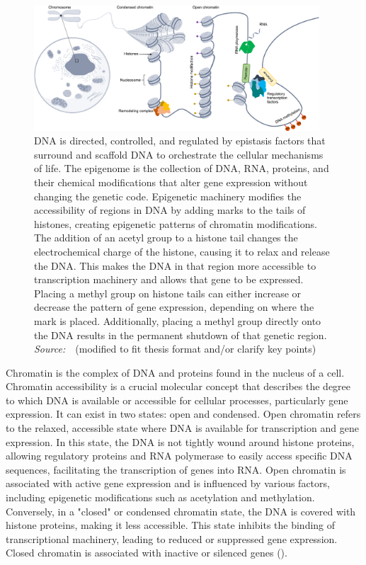 \begin{figure}[!ht]
	\centering
	\includegraphics[width=0.95\textwidth]{chromatin_organization/fig}
	\vspace{0.1cm}
	\caption[DNA organization] {DNA is directed, controlled, and regulated by epistasis factors that surround and scaffold DNA to orchestrate the cellular mechanisms of life. The epigenome is the collection of DNA, RNA, proteins, and their chemical modifications that alter gene expression without changing the genetic code. Epigenetic machinery modifies the accessibility of regions in DNA by adding marks to the tails of histones, creating epigenetic patterns of chromatin modifications. The addition of an acetyl group to a histone tail changes the electrochemical charge of the histone, causing it to relax and release the DNA. This makes the DNA in that region more accessible to transcription machinery and allows that gene to be expressed. Placing a methyl group on histone tails can either increase or decrease the pattern of gene expression, depending on where the mark is placed. Additionally, placing a methyl group directly onto the DNA results in the permanent shutdown of that genetic region. \emph{Source:~\cite{heumos2023best}}~(modified to fit thesis format and/or clarify key points)}
	\label{fig:chromatin_organization}
\end{figure}


Chromatin is the complex of DNA and proteins found in the nucleus of a cell. Chromatin accessibility is a crucial molecular concept that describes the degree to which DNA is available or accessible for cellular processes, particularly gene expression. It can exist in two states: open and condensed. Open chromatin refers to the relaxed, accessible state where DNA is available for transcription and gene expression. In this state, the DNA is not tightly wound around histone proteins, allowing regulatory proteins and RNA polymerase to easily access specific DNA sequences, facilitating the transcription of genes into RNA. Open chromatin is associated with active gene expression and is influenced by various factors, including epigenetic modifications such as acetylation and methylation. Conversely, in a "closed" or condensed chromatin state, the DNA is covered with histone proteins, making it less accessible. This state inhibits the binding of transcriptional machinery, leading to reduced or suppressed gene expression. Closed chromatin is associated with inactive or silenced genes ().




